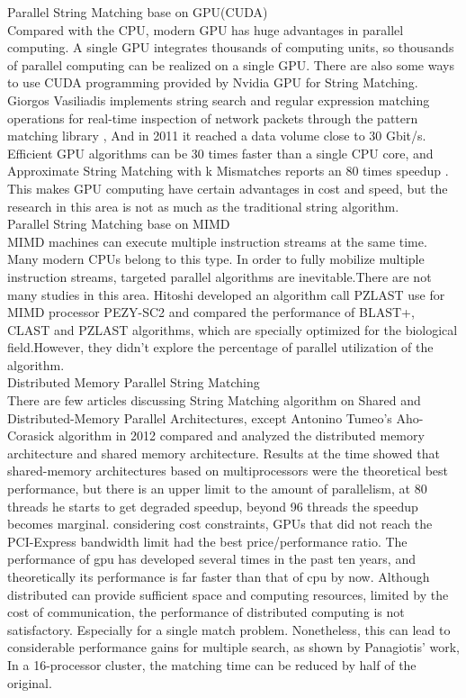 \documentclass[11pt]{article}       %
\begin{document}
Parallel String Matching base on GPU(CUDA)\\
Compared with the CPU, modern GPU has huge advantages in parallel computing. A single GPU integrates thousands of computing units, so thousands of parallel computing can be realized on a single GPU. There are also some ways to use CUDA programming provided by Nvidia GPU for String Matching. Giorgos Vasiliadis implements string search and regular expression matching operations for real-time inspection of network packets through the pattern matching library \cite{Bit-Parallel}, And in 2011 it reached a data volume close to 30 Gbit/s. Efficient GPU algorithms can be 30 times faster than a single CPU core, and Approximate String Matching with k Mismatches reports an 80 times speedup \cite{pattern-matching}. This makes GPU computing have certain advantages in cost and speed, but the research in this area is not as much as the traditional string algorithm. \\


Parallel String Matching base on MIMD\\
MIMD machines can execute multiple instruction streams at the same time. Many modern CPUs belong to this type. In order to fully mobilize multiple instruction streams, targeted parallel algorithms are inevitable.There are not many studies in this area. Hitoshi developed an algorithm call PZLAST use for MIMD processor PEZY-SC2 and compared the performance of BLAST+, CLAST and PZLAST algorithms\cite{MIMD}, which are specially optimized for the biological field.However, they didn't explore the percentage of parallel utilization of the algorithm.\\


Distributed Memory Parallel String Matching\\
There are few articles discussing String Matching algorithm on Shared and Distributed-Memory Parallel Architectures, except Antonino Tumeo's Aho-Corasick algorithm in 2012 compared and analyzed the distributed memory architecture and shared memory architecture\cite{Distributed-Memory}. Results at the time showed that shared-memory architectures based on multiprocessors were the theoretical best performance, but there is an upper limit to the amount of parallelism, at 80 threads he starts to get degraded speedup, beyond 96 threads the speedup becomes marginal. considering cost constraints, GPUs that did not reach the PCI-Express bandwidth limit had the best price/performance ratio. The performance of gpu has developed several times in the past ten years, and theoretically its performance is far faster than that of cpu by now. Although distributed can provide sufficient space and computing resources, limited by the cost of communication, the performance of distributed computing is not satisfactory. Especially for a single match problem. Nonetheless, this can lead to considerable performance gains for multiple search, as shown by Panagiotis' work\cite{MPI}, In a 16-processor cluster, the matching time can be reduced by half of the original.\\
\end{document}
